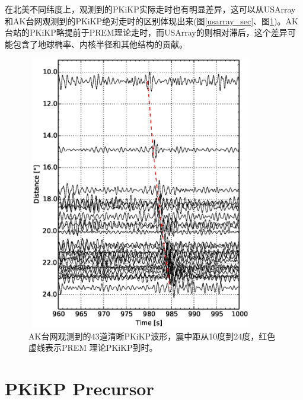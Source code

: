 在北美不同纬度上，观测到的PKiKP实际走时也有明显差异，这可以从USArray和AK台网观测到的PKiKP绝对走时的区别体现出来(图\ref{usarray_sec}、图\ref{ak_sec})。AK台站的PKiKP略提前于PREM理论走时，而USArray的则相对滞后，这个差异可能包含了地球椭率、内核半径和其他结构的贡献。

\begin{figure}[!ht]
	\centering
	\includegraphics[width=10cm,height=12cm]{fig/chap3/ak_sec.eps}
	\caption{AK台网观测到的43道清晰PKiKP波形，震中距从10度到24度，红色虚线表示PREM%
理论PKiKP到时。}
	\label{ak_sec}
\end{figure}

\newpage

\section{PKiKP Precursor}

